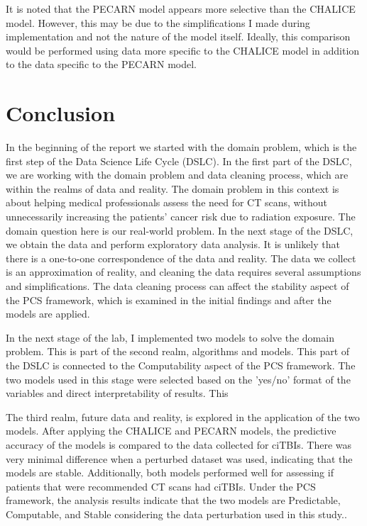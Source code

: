\documentclass[10pt,letterpaper]{article}
\begin{document}
It is noted that the PECARN model appears more selective than the CHALICE model. However, this  may be due to the simplifications I made during implementation and not the nature of the model itself. Ideally, this comparison would be performed using data more specific to the CHALICE model in addition to the data specific to the PECARN model. 

\section{Conclusion}\label{conclusion}
In the beginning of the report we started with the domain problem, which is the first step of the Data Science Life Cycle (DSLC). In the first part of the DSLC, we are working with the domain problem and data cleaning process, which are within the realms of data and reality. The domain problem in this context is about helping medical professionals assess the need for CT scans, without unnecessarily increasing the patients' cancer risk due to radiation exposure. The domain question here is our real-world problem. In the next stage of the DSLC, we obtain the data and perform exploratory data analysis. It is unlikely that there is a one-to-one correspondence of the data and reality. The data we collect is an approximation of reality, and cleaning the data requires several assumptions and simplifications. The data cleaning process can affect the stability aspect of the PCS framework, which is examined in the initial findings and after the models are applied.

In the next stage of the lab, I implemented two models to solve the domain problem. This is part of the second realm, algorithms and models. This part of the DSLC is connected to the Computability aspect of the PCS framework. The two models used in this stage were selected based on the 'yes/no' format of the variables and direct interpretability of results. This 

The third realm, future data and reality, is explored in the application of the two models. After applying the CHALICE and PECARN models, the predictive accuracy of the models is compared to the data collected for ciTBIs. There was very minimal difference when a perturbed dataset was used, indicating that the models are stable. Additionally, both models performed well for assessing if patients that were recommended CT scans had ciTBIs. Under the PCS framework, the analysis results indicate that the two models are Predictable, Computable, and Stable considering the data perturbation used in this study..
\end{document}
